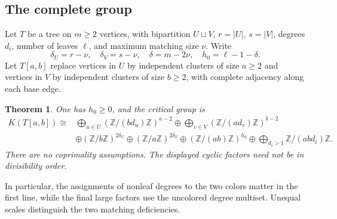 \documentclass[11pt,a4paper]{article}
\newtheorem{theorem}{Theorem}[section]
\theoremstyle{definition}\newtheorem{definition}[theorem]{Definition}
\theoremstyle{remark}\newtheorem{remark}[theorem]{Remark}
\newcommand{\Z}{\mathbb Z}\newcommand{\Q}{\mathbb Q}\newcommand{\F}{\mathbb F}
\numberwithin{equation}{section}
\begin{document}
\subsection{The complete group}\label{K07-sec-1}
Let $T$ be a tree on $m\geq2$ vertices, with bipartition $U\sqcup V$, $r=|U|$, $s=|V|$, degrees $d_i$, number of leaves $\ell$, and maximum matching size $\nu$. Write
\[
 \delta_U=r-\nu,\quad \delta_V=s-\nu,\quad
 \delta=m-2\nu,\quad h_0=\ell-1-\delta.
\]
Let $T[a,b]$ replace vertices in $U$ by independent clusters of size $a\geq2$ and vertices in $V$ by independent clusters of size $b\geq2$, with complete adjacency along each base edge.
\begin{theorem}\label{K07-main}
One has $h_0\geq0$, and the critical group is
\begin{align*}
 K(T[a,b])\cong{}&
 \bigoplus_{u\in U}(\Z/(bd_u)\Z)^{a-2}
 \oplus\bigoplus_{v\in V}(\Z/(ad_v)\Z)^{b-2}\\
 &\oplus(\Z/b\Z)^{2\delta_U}
 \oplus(\Z/a\Z)^{2\delta_V}
 \oplus(\Z/(ab)\Z)^{h_0}
 \oplus\bigoplus_{d_i>1}\Z/(ab d_i)\Z.                      \tag{K07.1}
\end{align*}
There are no coprimality assumptions. The displayed cyclic factors need not be in divisibility order.
\end{theorem}
In particular, the assignments of nonleaf degrees to the two colors matter in the first line, while the final large factors use the uncolored degree multiset. Unequal scales distinguish the two matching deficiencies.
\end{document}
